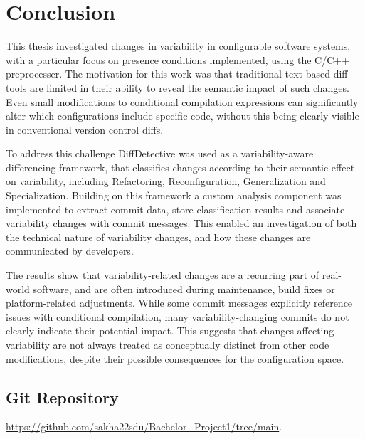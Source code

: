 
\chapter{Conclusion}

This thesis investigated changes in variability in configurable software systems, with a particular focus on presence conditions implemented, using the C/C++ preprocesser. The motivation for this work was that traditional text-based diff tools are limited in their ability to reveal the semantic impact of such changes. Even small modifications to conditional compilation expressions can significantly alter which configurations include specific code, without this being clearly visible in conventional version control diffs.

To address this challenge DiffDetective was used as a variability-aware differencing framework, that classifies changes according to their semantic effect on variability, including Refactoring, Reconfiguration, Generalization and Specialization. Building on this framework a custom analysis component was implemented to extract commit data, store classification results and associate variability changes with commit messages. This enabled an investigation of both the technical nature of variability changes, and how these changes are communicated by developers.

The results show that variability-related changes are a recurring part of real-world software, and are often introduced during maintenance, build fixes or platform-related adjustments. While some commit messages explicitly reference issues with conditional compilation, many variability-changing commits do not clearly indicate their potential impact. This suggests that changes affecting variability are not always treated as conceptually distinct from other code modifications, despite their possible consequences for the configuration space.






\section{Git Repository}
\url{https://github.com/sakha22sdu/Bachelor_Project1/tree/main}.